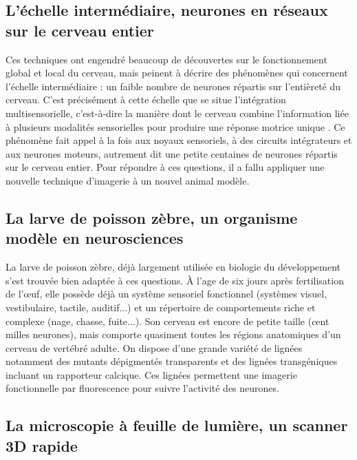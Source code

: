 \subsection{L'échelle intermédiaire, neurones en réseaux sur le cerveau entier}

Ces techniques ont engendré beaucoup de découvertes sur le fonctionnement global et local du cerveau, mais peinent à décrire des phénomènes qui concernent l'échelle intermédiaire : un faible nombre de neurones répartis sur l'entièreté du cerveau. C'est précisément à cette échelle que se situe l'intégration multisensorielle, c'est-à-dire la manière dont le cerveau combine l'information liée à plusieurs modalités sensorielles pour produire une réponse motrice unique \cite{stein_multisensory_2008}. Ce phénomène fait appel à la fois aux noyaux sensoriels, à des circuits intégrateurs et aux neurones moteurs, autrement dit une petite centaines de neurones répartis sur le cerveau entier. Pour répondre à ces questions, il a fallu appliquer une nouvelle technique d'imagerie à un nouvel animal modèle.


\subsection{La larve de poisson zèbre, un organisme modèle en neurosciences}

La larve de poisson zèbre, déjà largement utilisée en biologie du développement s'est trouvée bien adaptée à ces questions. À l'age de six jours après fertilisation de l’œuf, elle possède déjà un système sensoriel fonctionnel (systèmes visuel, vestibulaire, tactile, auditif...) et un répertoire de comportements riche et complexe (nage, chasse, fuite...). Son cerveau est encore de petite taille (cent milles neurones), mais comporte quasiment toutes les régions anatomiques d'un cerveau de vertébré adulte. On dispose d'une grande variété de lignées notamment des mutants dépigmentés transparents et des lignées transgéniques incluant un rapporteur calcique. Ces lignées permettent une imagerie fonctionnelle par fluorescence pour suivre l'activité des neurones.

\subsection{La microscopie à feuille de lumière, un scanner 3D rapide}

